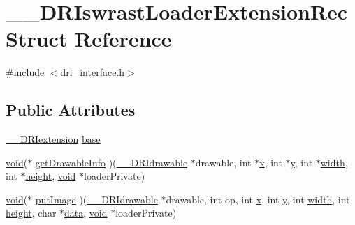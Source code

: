 \hypertarget{struct_____d_r_iswrast_loader_extension_rec}{}\section{\+\_\+\+\_\+\+D\+R\+Iswrast\+Loader\+Extension\+Rec Struct Reference}
\label{struct_____d_r_iswrast_loader_extension_rec}


{\ttfamily \#include $<$dri\+\_\+interface.\+h$>$}

\subsection*{Public Attributes}
\begin{DoxyCompactItemize}
\item 
\hyperlink{dri__interface_8h_a4e0a61c8ece00d2b2c6792a9a1b55385}{\+\_\+\+\_\+\+D\+R\+Iextension} \hyperlink{struct_____d_r_iswrast_loader_extension_rec_a96cf72333713114d44048417ae72c9a5}{base}
\item 
\hyperlink{_s_d_l__opengles2__gl2ext_8h_ae5d8fa23ad07c48bb609509eae494c95}{void}($\ast$ \hyperlink{struct_____d_r_iswrast_loader_extension_rec_ac0e232e86beb80b3eab60660cc4facff}{get\+Drawable\+Info} )(\hyperlink{dri__interface_8h_a5bfb832a0a08208d95b3bbef439d2262}{\+\_\+\+\_\+\+D\+R\+Idrawable} $\ast$drawable, int $\ast$\hyperlink{gl_8h_ad0e63d0edcdbd3d79554076bf309fd47}{x}, int $\ast$\hyperlink{gl_8h_a1675d9d7bb68e1657ff028643b4037e3}{y}, int $\ast$\hyperlink{gl_8h_a9a82cf3caff84cabc4598e2619faac17}{width}, int $\ast$\hyperlink{gl_8h_aa352f2804b9902ac30769c00dde75d5f}{height}, \hyperlink{_s_d_l__opengles2__gl2ext_8h_ae5d8fa23ad07c48bb609509eae494c95}{void} $\ast$loader\+Private)
\item 
\hyperlink{_s_d_l__opengles2__gl2ext_8h_ae5d8fa23ad07c48bb609509eae494c95}{void}($\ast$ \hyperlink{struct_____d_r_iswrast_loader_extension_rec_a9c1f99c2a8270652f8637e1e415bbd0a}{put\+Image} )(\hyperlink{dri__interface_8h_a5bfb832a0a08208d95b3bbef439d2262}{\+\_\+\+\_\+\+D\+R\+Idrawable} $\ast$drawable, int op, int \hyperlink{gl_8h_ad0e63d0edcdbd3d79554076bf309fd47}{x}, int \hyperlink{gl_8h_a1675d9d7bb68e1657ff028643b4037e3}{y}, int \hyperlink{gl_8h_a9a82cf3caff84cabc4598e2619faac17}{width}, int \hyperlink{gl_8h_aa352f2804b9902ac30769c00dde75d5f}{height}, char $\ast$\hyperlink{gl_8h_a2e335d56e2846b0fea47eed068b2d34a}{data}, \hyperlink{_s_d_l__opengles2__gl2ext_8h_ae5d8fa23ad07c48bb609509eae494c95}{void} $\ast$loader\+Private)

\end{DoxyCompactItemize}
